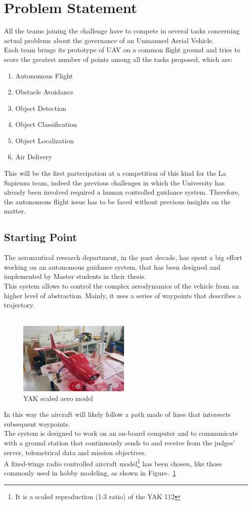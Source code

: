 \documentclass[oneside,onecolumn]{article}
\begin{document}
\section{Problem Statement}
All the teams joining the challenge have to compete in several tasks concerning actual problems about the governance of an Unmanned Aerial Vehicle.\\
Each team brings its prototype of UAV on a common flight ground and tries to score the greatest number of points among all the tasks proposed, which are:
\begin{enumerate}\centering
\item Autonomous Flight
\item Obstacle Avoidance
\item Object Detection
\item Object Classification
\item Object Localization 
\item Air Delivery
\end{enumerate}
This will be the first partecipation at a competition of this kind for the La Sapienza team, indeed the previous challenges in which the University has already been involved required a human controlled guidance system. Therefore, the autonomous flight issue has to be faced without previous
insights on the matter.
\newpage

\subsection{Starting Point}
The aeronautical research department, in the past decade, has spent a big effort working on an autonomous guidance system, that has been designed and implemented by Master students in their thesis.\\
This system allows to control the complex aerodynamics of the vehicle from an higher level of abstraction. Mainly, it uses a series of waypoints that describes a trajectory.\\\\
\begin{figure}
\caption{YAK scaled aero model}\label{wrap-fig:1}
\includegraphics[width=5.5cm]{YAK1}
\end{figure} 
In this way the aircraft will likely follow a path made of lines that intersects subsequent waypoints.\\
The system is designed to work on an on-board computer and to communicate with a ground station that continuously sends to and receive from the judges' server, telemetrical data and mission objectives.\\
A fixed-wings radio controlled aircraft model\footnote{It is a scaled reproduction (1:3 ratio) of the YAK 112} has been chosen, like those commonly used in hobby modeling, as shown in Figure.~\ref{wrap-fig:1}
\end{document}

